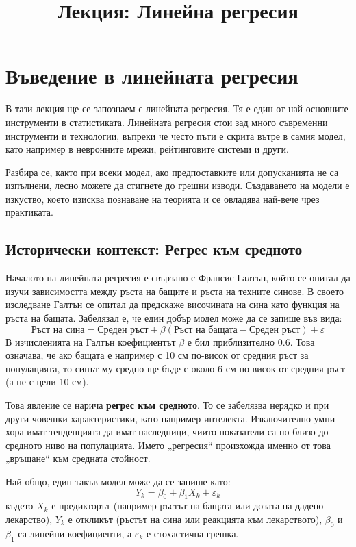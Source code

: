 \documentclass{article}
\begin{document}
\title{Лекция: Линейна регресия}
\author{}
\date{}
\maketitle

\section{Въведение в линейната регресия}

В тази лекция ще се запознаем с линейната регресия. Тя е един от най-основните инструменти в статистиката. Линейната регресия стои зад много съвременни инструменти и технологии, въпреки че често пъти е скрита вътре в самия модел, като например в невронните мрежи, рейтинговите системи и други. 

Разбира се, както при всеки модел, ако предпоставките или допусканията не са изпълнени, лесно можете да стигнете до грешни изводи. Създаването на модели е изкуство, което изисква познаване на теорията и се овладява най-вече чрез практиката.

\subsection{Исторически контекст: Регрес към средното}
Началото на линейната регресия е свързано с Франсис Галтън, който се опитал да изучи зависимостта между ръста на бащите и ръста на техните синове. В своето изследване Галтън се опитал да предскаже височината на сина като функция на ръста на бащата. Забелязал е, че един добър модел може да се запише във вида:
\[
\text{Ръст на сина} = \text{Среден ръст} + \beta (\text{Ръст на бащата} - \text{Среден ръст}) + \varepsilon
\]
В изчисленията на Галтън коефициентът $\beta$ е бил приблизително $0.6$. Това означава, че ако бащата е например с 10 см по-висок от средния ръст за популацията, то синът му средно ще бъде с около 6 см по-висок от средния ръст (а не с цели 10 см). 

Това явление се нарича \textbf{регрес към средното}. То се забелязва нерядко и при други човешки характеристики, като например интелекта. Изключително умни хора имат тенденцията да имат наследници, чиито показатели са по-близо до средното ниво на популацията. Името „регресия“ произхожда именно от това „връщане“ към средната стойност.

Най-общо, един такъв модел може да се запише като:
\[
Y_k = \beta_0 + \beta_1 X_k + \varepsilon_k
\]
където $X_k$ е предикторът (например ръстът на бащата или дозата на дадено лекарство), $Y_k$ е откликът (ръстът на сина или реакцията към лекарството), $\beta_0$ и $\beta_1$ са линейни коефициенти, а $\varepsilon_k$ е стохастична грешка.
\end{document}

